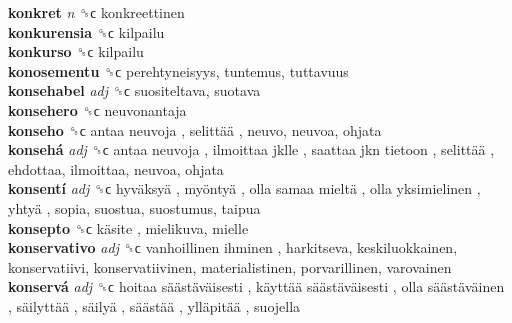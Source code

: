 \textbf{konkret} \emph{n}  ␝ϲ  konkreettinen  \\
\textbf{konkurensia} ␝ϲ  kilpailu  \\
\textbf{konkurso} ␝ϲ  kilpailu  \\
\textbf{konosementu} ␝ϲ  perehtyneisyys, tuntemus, tuttavuus  \\
\textbf{konsehabel} \emph{adj}  ␝ϲ  suositeltava, suotava  \\
\textbf{konsehero} ␝ϲ  neuvonantaja  \\
\textbf{konseho} ␝ϲ   antaa neuvoja ,  selittää , neuvo, neuvoa, ohjata  \\
\textbf{konsehá} \emph{adj}  ␝ϲ   antaa neuvoja ,  ilmoittaa jklle ,  saattaa jkn tietoon ,  selittää , ehdottaa, ilmoittaa, neuvoa, ohjata  \\
\textbf{konsentí} \emph{adj}  ␝ϲ   hyväksyä ,  myöntyä ,  olla samaa mieltä ,  olla yksimielinen ,  yhtyä , sopia, suostua, suostumus, taipua  \\
\textbf{konsepto} ␝ϲ   käsite , mielikuva, mielle  \\
\textbf{konservativo} \emph{adj}  ␝ϲ   vanhoillinen ihminen , harkitseva, keskiluokkainen, konservatiivi, konservatiivinen, materialistinen, porvarillinen, varovainen  \\
\textbf{konservá} \emph{adj}  ␝ϲ   hoitaa säästäväisesti ,  käyttää säästäväisesti ,  olla säästäväinen ,  säilyttää ,  säilyä ,  säästää ,  ylläpitää , suojella  \\
